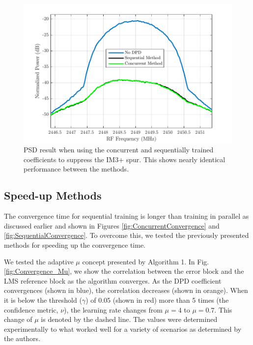 \begin{figure}[t!] 
\centering
\includegraphics[width=0.9\columnwidth]{Figures/IterativeSpectrumvsConcurrent}
\caption{PSD result when using the concurrent and sequentially trained coefficients to suppress the IM3+ spur. 
	This shows nearly identical performance between the methods.}
\label{fig:IterativeSpectrumvsConcurrent}
\end{figure}

\subsection{Speed-up Methods}
The convergence time for sequential training is longer than training in parallel as discussed earlier and shown in Figures \ref{fig:ConcurrentConvergence} and \ref{fig:SequentialConvergence}. 
To overcome this, we tested the previously presented methods for speeding up the convergence time.

We tested the adaptive $\mu$ concept presented by Algorithm 1. 
In Fig. \ref{fig:Convergence_Mu}, we show the correlation between the error block and the LMS reference block as the algorithm converges. 
As the DPD coefficient convergences (shown in blue), the correlation decreases (shown in orange). 
When it is below the threshold ($\gamma$) of 0.05 (shown in red) more than 5 times (the confidence metric, $\nu$), the learning rate changes from $\mu = 4$ to $\mu = 0.7$. 
This change of $\mu$ is denoted by the dashed line. 
The values were determined experimentally to what worked well for a variety of scenarios as determined by the authors. 

